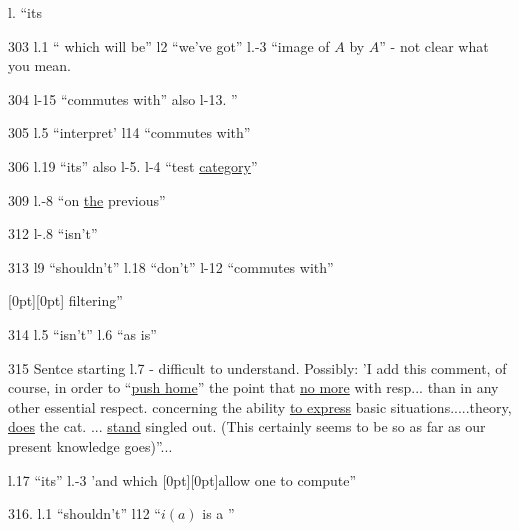 \noindent{}

 l. ``its

303 l.1 `` which will be'' l2 ``we've got'' l.-3 ``image of $A$ by $A$'' - not clear what you mean.

304 l-15 ``commutes with'' also l-13. ''

305 l.5 ``interpret' l14 ``commutes with''

306 l.19 ``its''  also l-5. l-4 ``test \uline{category}''

309 l.-8 ``on \uline{the} previous''

312 l-.8 ``isn't'' 

313 l9 ``shouldn't'' l.18 ``don't'' l-12 ``commutes with''

\raisebox{1.2ex}[0pt][0pt]{}\hspace{1.6em} filtering''

314 l.5 ``isn't'' l.6 ``as is''

315 Sentce starting l.7 - difficult to understand. Possibly: 'I add this comment, of course,  in order to ``\uline{push home}'' the point that \uline{no more} with resp... than in any other essential respect. concerning the ability \uline{to express} basic situations.....theory, \uline{does} the cat. ... \uline{stand} singled out.  (This certainly seems to be so as far as our present knowledge goes)''...

l.17 ``its'' l.-3 'and which \raisebox{1.2ex}[0pt][0pt]{}allow one to compute''

316. l.1 ``shouldn't'' l12 ``$i(a)$  is a ''

